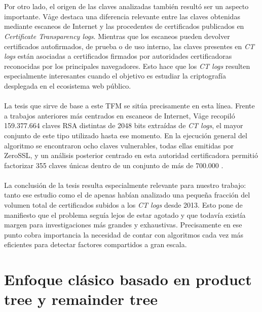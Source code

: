 \\
\\
Por otro lado, el origen de las claves analizadas también resultó ser un aspecto importante. Våge destaca una diferencia relevante entre las claves obtenidas mediante escaneos de Internet y las procedentes de certificados publicados en \textit{Certificate Transparency logs}. Mientras que los escaneos pueden devolver certificados autofirmados, de prueba o de uso interno, las claves presentes en \textit{CT logs} están asociadas a certificados firmados por autoridades certificadoras reconocidas por los principales navegadores. Esto hace que los \textit{CT logs} resulten especialmente interesantes cuando el objetivo es estudiar la criptografía desplegada en el ecosistema web público.
\\
\\
La tesis que sirve de base a este TFM se sitúa precisamente en esta línea. Frente a trabajos anteriores más centrados en escaneos de Internet, Våge recopiló 159.377.664 claves RSA distintas de 2048 bits extraídas de \textit{CT logs}, el mayor conjunto de este tipo utilizado hasta ese momento. En la ejecución general del algoritmo se encontraron ocho claves vulnerables, todas ellas emitidas por ZeroSSL, y un análisis posterior centrado en esta autoridad certificadora permitió factorizar 355 claves únicas dentro de un conjunto de más de 700.000 \citep{vage2022finding}.
\\
\\
La conclusión de la tesis resulta especialmente relevante para nuestro trabajo: tanto ese estudio como el de \citet{kilgallin2019factoring} apenas habían analizado una pequeña fracción del volumen total de certificados subidos a los \textit{CT logs} desde 2013. Esto pone de manifiesto que el problema seguía lejos de estar agotado y que todavía existía margen para investigaciones más grandes y exhaustivas. Precisamente en ese punto cobra importancia la necesidad de contar con algoritmos cada vez más eficientes para detectar factores compartidos a gran escala.

\section{Enfoque clásico basado en product tree y remainder tree}

